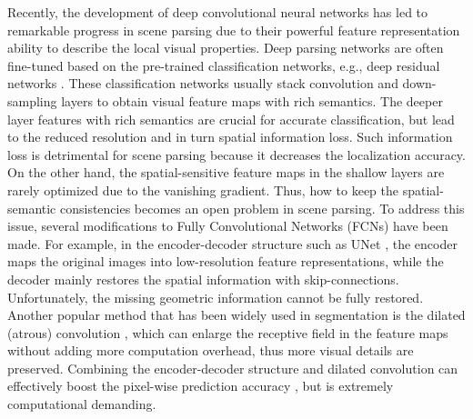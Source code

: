 \documentclass[10pt,twocolumn,twoside]{IEEEtran}
\begin{document}
Recently, the development of deep convolutional neural networks has led to remarkable progress in scene parsing due to their powerful feature representation ability to describe the local visual properties. Deep parsing networks are often fine-tuned based on the pre-trained classification networks, e.g., deep residual networks \cite{CVPR16:RESNET}. These classification networks usually stack convolution and down-sampling layers to obtain visual feature maps with rich semantics. The deeper layer features with rich semantics are crucial for accurate classification, but lead to the reduced resolution and in turn spatial information loss. Such information loss is detrimental for scene parsing because it decreases the localization accuracy. On the other hand, the spatial-sensitive feature maps in the shallow layers are rarely optimized due to the vanishing gradient. Thus, how to keep the spatial-semantic consistencies becomes an open problem in scene parsing. To address this issue, several modifications to Fully Convolutional Networks (FCNs) \cite{CVPR15:FCN} have been made. For example, in the encoder-decoder structure such as UNet \cite{MICCAI15:UNET}, the encoder maps the original images into low-resolution feature representations, while the decoder mainly restores the spatial information with skip-connections. Unfortunately, the missing geometric information cannot be fully restored. Another popular method that has been widely used in segmentation is the dilated (atrous) convolution \cite{ARXIV:DILATED}, which can enlarge the receptive field in the feature maps without adding more computation overhead, thus more visual details are preserved. Combining the encoder-decoder structure and dilated convolution can effectively boost the pixel-wise prediction accuracy \cite{TPAMI:DEEPLAB}, but is extremely computational demanding.
\end{document}
